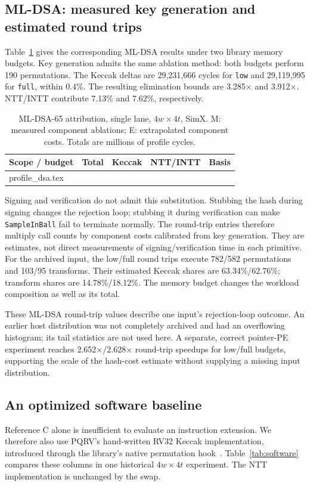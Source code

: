\documentclass[conference,letterpaper]{IEEEtran}
\makeatletter
\newcommand{\tablerows}[1]{\@@input #1 }
\newcommand{\code}[1]{\texttt{#1}}
\newcommand{\src}[1]{\par\smallskip{\scriptsize Source: \nolinkurl{#1}.}}
\makeatother
\begin{document}
\subsection{ML-DSA: measured key generation and estimated round trips}
Table~\ref{tab:dsaprofile} gives the corresponding ML-DSA results under two
library memory budgets. Key generation admits the same ablation method:
both budgets perform 190 permutations. The Keccak deltas are 29,231,666
cycles for \code{low} and 29,119,995 for \code{full}, within 0.4\%.
The resulting elimination bounds are 3.285$\times$ and 3.912$\times$.
NTT/INTT contribute 7.13\% and 7.62\%, respectively.

\begin{table}[t]
\caption{ML-DSA-65 attribution, single lane, $4w\times4t$, SimX.
M: measured component ablations; E: extrapolated component costs.
Totals are millions of profile cycles.}
\label{tab:dsaprofile}
\centering\footnotesize\setlength{\tabcolsep}{4pt}
\begin{tabular}{@{}lrrrr@{}}
\toprule
Scope / budget & Total & Keccak & NTT/INTT & Basis \\
\midrule
\tablerows{profile_dsa.tex}
\bottomrule
\end{tabular}
\src{pqc/results/ablation_mldsa.csv}
\end{table}

Signing and verification do not admit this substitution.
Stubbing the hash during signing changes the rejection loop; stubbing it
during verification can make \code{SampleInBall} fail to terminate normally.
The round-trip entries therefore multiply call counts by component costs
calibrated from key generation. They are estimates, not direct
measurements of signing/verification time in each primitive.
For the archived input, the low/full round trips execute 782/582
permutations and 103/95 transforms. Their estimated Keccak shares are
63.34\%/62.76\%; transform shares are 14.78\%/18.12\%.
The memory budget changes the workload composition as well as its total.

These ML-DSA round-trip values describe one input's rejection-loop outcome.
An earlier host distribution was not completely archived and had an
overflowing histogram; its tail statistics are not used here.
A separate, correct pointer-PE experiment reaches 2.652$\times$/2.628$\times$
round-trip speedups for low/full budgets, supporting the scale of the
hash-cost estimate without supplying a missing input distribution.

\subsection{An optimized software baseline}
Reference C alone is insufficient to evaluate an instruction extension.
We therefore also use PQRV's hand-written RV32 Keccak implementation,
introduced through the library's native permutation hook~\cite{pqrv}.
Table~\ref{tab:software} compares these columns in one historical
$4w\times4t$ experiment. The NTT implementation is unchanged by the swap.
\end{document}
